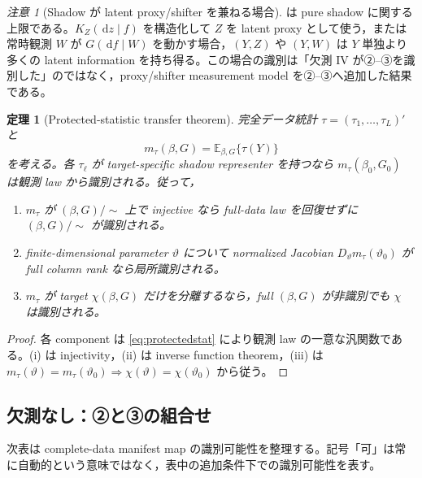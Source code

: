 \documentclass[11pt,a4paper]{ltjsarticle}
\newtheorem{theorem}{定理}[section]
\theoremstyle{remark}
\newtheorem{remark}{注意}[section]
\newcommand{\E}{\mathbb E}
\newcommand{\dd}{\,\mathrm d}
\begin{document}
\begin{remark}[Shadow が latent proxy/shifter を兼ねる場合]
 は pure shadow に関する上限である。$K_Z(\dd z\mid f)$ を構造化して $Z$ を latent proxy として使う，または常時観測 $W$ が $G(\dd f\mid W)$ を動かす場合，$(Y,Z)$ や $(Y,W)$ は $Y$ 単独より多くの latent information を持ち得る。この場合の識別は「欠測 IV が②--③を識別した」のではなく，proxy/shifter measurement model を②--③へ追加した結果である。
\end{remark}

\begin{theorem}[Protected-statistic transfer theorem]
\label{thm:protectedtransferappendix}
完全データ統計 $\tau=(\tau_1,\ldots,\tau_L)'$ と
\[
 m_\tau(\beta,G)=\E_{\beta,G}\{\tau(Y)\}
\]
を考える。各 $\tau_\ell$ が target-specific shadow representer を持つなら $m_\tau(\beta_0,G_0)$ は観測 law から識別される。従って，
\begin{enumerate}[label=(\roman*)]
\item $m_\tau$ が $(\beta,G)/{\sim}$ 上で injective なら full-data law を回復せずに $(\beta,G)/{\sim}$ が識別される。
\item finite-dimensional parameter $\vartheta$ について normalized Jacobian $D_\vartheta m_\tau(\vartheta_0)$ が full column rank なら局所識別される。
\item $m_\tau$ が target $\chi(\beta,G)$ だけを分離するなら，full $(\beta,G)$ が非識別でも $\chi$ は識別される。
\end{enumerate}
\end{theorem}

\begin{proof}
各 component は \eqref{eq:protectedstat} により観測 law の一意な汎関数である。(i) は injectivity，(ii) は inverse function theorem，(iii) は $m_\tau(\vartheta)=m_\tau(\vartheta_0)\Rightarrow\chi(\vartheta)=\chi(\vartheta_0)$ から従う。
\end{proof}

\subsection{欠測なし：②と③の組合せ}

次表は complete-data manifest map の識別可能性を整理する。記号「可」は常に自動的という意味ではなく，表中の追加条件下での識別可能性を表す。
\end{document}
